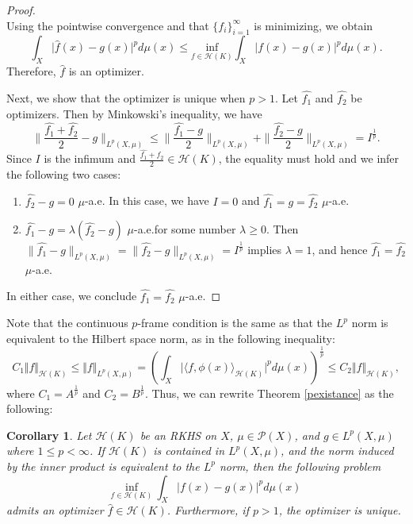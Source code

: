 \documentclass{amsart}
\numberwithin{equation}{section}
\theoremstyle{plain}
\newtheorem{corollary}[subsection]{Corollary}
\theoremstyle{remark}
\theoremstyle{definition}
\begin{document}
\begin{proof}
\begin{equation*}
\end{equation*}
Using the pointwise convergence and that $\{f_i\}_{i=1}^{\infty}$ is minimizing, we obtain
\begin{equation*}
     \int_{X}  \vert \hat{f}(x) - g(x) \vert ^p d\mu(x) \leq  \underset{f \in \mathscr{H}(K)}{\text{inf}} \int_{X}  \vert f(x) - g(x) \vert ^p d\mu(x).
\end{equation*}
Therefore, $\hat{f}$ is an optimizer. 
\par
Next, we show that the optimizer is unique when $p>1$.
 Let $\hat{f_1}$ and $\hat{f_2}$ be optimizers. Then by Minkowski's inequality, we have
\begin{equation*}
    \| \frac{\hat{f_1}+\hat{f_2}}{2}-g \|_{L^p(X,\mu)} \leq \|\frac{\hat{f_1}-g}{2} \|_{L^p(X,\mu)} + \|\frac{\hat{f_2}-g}{2} \|_{L^p(X,\mu)}=I^\frac{1}{p}.
\end{equation*}
Since $I$ is the infimum and $\frac{\hat{f_1}+\hat{f_2}}{2} \in \mathscr{H}(K)$, the equality must hold and we infer the following two cases:
\begin{enumerate}
    \item $\hat{f_2}-g=0$ $\mu$-a.e.
    In this case, we have $I=0$ and $\hat{f_1}=g=\hat{f_2}$ $\mu$-a.e.

    \item $\hat{f_1}-g=\lambda(\hat{f_2}-g)$ $\mu$-a.e.\@ for some number $\lambda\geq 0$. Then $ \|\hat{f_1}-g \|_{L^p(X,\mu)} = \|\hat{f_2}-g \|_{L^p(X,\mu)} = I^{\frac{1}{p}}$ implies $\lambda=1$, and hence $\hat{f_1}=\hat{f_2}$ $\mu$-a.e. 
\end{enumerate}
In either case, we conclude $\hat{f_1}=\hat{f_2}$ $\mu$-a.e. 
\end{proof}


Note that the continuous $p$-frame condition is the same as that the $L^p$ norm is equivalent to the Hilbert space norm, as in the following inequality:
    \begin{equation*}
    C_1 \Vert f \Vert_{\mathscr{H}(K)} \leq  \Vert f \Vert_{L^p(X,\mu)}
    =\left(\int_{X} \vert \langle f, \phi(x) \rangle_{\mathscr{H}(K)} \vert ^p d\mu(x)\right)^\frac{1}{p}
    \leq  C_2 \Vert f \Vert_{\mathscr{H}(K)}, 
\end{equation*}
where $C_1 = A^{\frac{1}{p}}$ and $C_2 = B^{\frac{1}{p}}$.
Thus, we can rewrite Theorem \ref{pexistance} as the following:

\begin{corollary}\label{LpSubspace}
    Let $\mathscr{H}(K)$ be an RKHS on $X$, $\mu \in \mathscr{P}(X)$, and $g \in L^p(X,\mu)$ where $1 \leq p<\infty$.
    If $\mathscr{H}(K)$ is contained in $L^p(X,\mu)$, and the norm induced by the inner product is equivalent to the $L^p$ norm,
    then the following problem 
    \begin{equation*}
    \underset{f \in \mathscr{H}(K)}{\text{inf}} \ \int_{X} \vert f(x) - g(x) \vert ^p d\mu(x)
\end{equation*}
admits an optimizer $\hat{f} \in \mathscr{H}(K)$. Furthermore, if $p>1$, the optimizer is unique.
\end{corollary}
\end{document}
